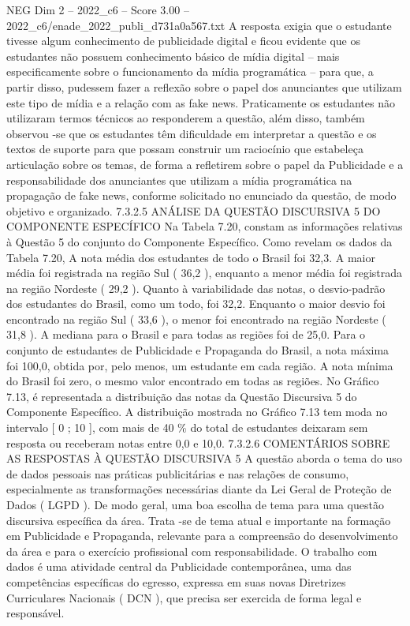 \begin{textsample}{NEG Dim 2 – 2022\_c6 – Score 3.00 – 2022\_c6/enade\_2022\_publi\_d731a0a567.txt}
A resposta exigia que o estudante tivesse algum conhecimento de publicidade digital e ficou evidente que os estudantes não possuem conhecimento básico de mídia digital – mais especificamente sobre o funcionamento da mídia programática – para que, a partir disso, pudessem fazer a reflexão sobre o papel dos anunciantes que utilizam este tipo de mídia e a relação com as fake news.
Praticamente os estudantes não utilizaram termos técnicos ao responderem a questão, além disso, também observou -se que os estudantes têm dificuldade em interpretar a questão e os textos de suporte para que possam construir um raciocínio que estabeleça articulação sobre os temas, de forma a refletirem sobre o papel da Publicidade e a responsabilidade dos anunciantes que utilizam a mídia programática na propagação de fake news, conforme solicitado no enunciado da questão, de modo objetivo e organizado. 7.3.2.5 ANÁLISE DA QUESTÃO DISCURSIVA 5 DO COMPONENTE ESPECÍFICO Na Tabela 7.20, constam as informações relativas à Questão 5 do conjunto do Componente Específico.
Como revelam os dados da Tabela 7.20, A nota média dos estudantes de todo o Brasil foi 32,3.
A maior média foi registrada na região Sul ( 36,2 ), enquanto a menor média foi registrada na região Nordeste ( 29,2 ).
Quanto à variabilidade das notas, o desvio-padrão dos estudantes do Brasil, como um todo, foi 32,2.
Enquanto o maior desvio foi encontrado na região Sul ( 33,6 ), o menor foi encontrado na região Nordeste ( 31,8 ).
A mediana para o Brasil e para todas as regiões foi de 25,0.
Para o conjunto de estudantes de Publicidade e Propaganda do Brasil, a nota máxima foi 100,0, obtida por, pelo menos, um estudante em cada região.
A nota mínima do Brasil foi zero, o mesmo valor encontrado em todas as regiões.
No Gráfico 7.13, é representada a distribuição das notas da Questão Discursiva 5 do Componente Específico.
A distribuição mostrada no Gráfico 7.13 tem moda no intervalo [ 0 ; 10 ], com mais de 40 \% do total de estudantes deixaram sem resposta ou receberam notas entre 0,0 e 10,0. 7.3.2.6 COMENTÁRIOS SOBRE AS RESPOSTAS À QUESTÃO DISCURSIVA 5 A questão aborda o tema do uso de dados pessoais nas práticas publicitárias e nas relações de consumo, especialmente as transformações necessárias diante da Lei Geral de Proteção de Dados ( LGPD ).
De modo geral, uma boa escolha de tema para uma questão discursiva específica da área.
Trata -se de tema atual e importante na formação em Publicidade e Propaganda, relevante para a compreensão do desenvolvimento da área e para o exercício profissional com responsabilidade.
O trabalho com dados é uma atividade central da Publicidade contemporânea, uma das competências específicas do egresso, expressa em suas novas Diretrizes Curriculares Nacionais ( DCN ), que precisa ser exercida de forma legal e responsável.

\end{textsample}
